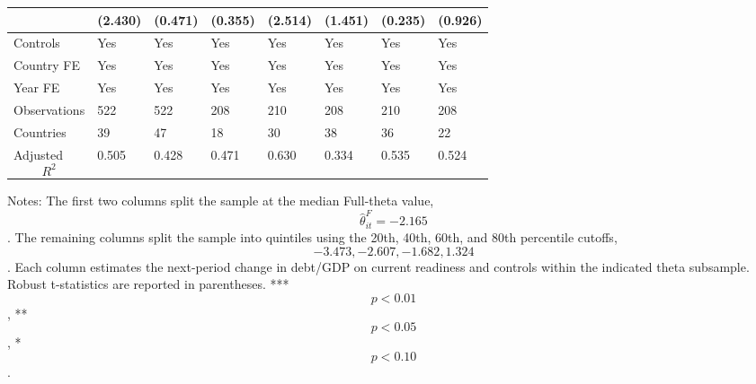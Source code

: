 \begin{table}[H]
\begin{threeparttable}
\begin{tabularx}{\textwidth}{lYYYYYYY}
  & (2.430) & (0.471) & (0.355) & (2.514) & (1.451) & (0.235) & (0.926) \\
\midrule
Controls & Yes & Yes & Yes & Yes & Yes & Yes & Yes \\
Country FE & Yes & Yes & Yes & Yes & Yes & Yes & Yes \\
Year FE & Yes & Yes & Yes & Yes & Yes & Yes & Yes \\
Observations & 522 & 522 & 208 & 210 & 208 & 210 & 208 \\
Countries & 39 & 47 & 18 & 30 & 38 & 36 & 22 \\
Adjusted $$R^2$$ & 0.505 & 0.428 & 0.471 & 0.630 & 0.334 & 0.535 & 0.524 \\
\bottomrule
\end{tabularx}
\begin{tablenotes}[flushleft]\footnotesize
\item Notes: The first two columns split the sample at the median Full-theta value, $$\widehat{\theta}^{F}_{it}=-2.165$$. The remaining columns split the sample into quintiles using the 20th, 40th, 60th, and 80th percentile cutoffs, $$-3.473, -2.607, -1.682, 1.324$$. Each column estimates the next-period change in debt/GDP on current readiness and controls within the indicated theta subsample. Robust t-statistics are reported in parentheses. *** $$p<0.01$$, ** $$p<0.05$$, * $$p<0.10$$.
\end{tablenotes}
\end{threeparttable}
\end{table}
